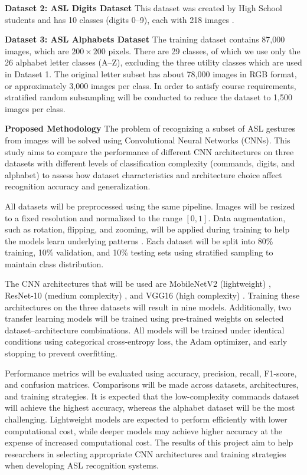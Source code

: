 \documentclass[10pt,twocolumn,letterpaper]{article}
\begin{document}
\vspace{0.5em}
\noindent\textbf{Dataset 2: ASL Digits Dataset \textbullet}
This dataset was created by High School students and has 10 classes (digits 0--9), each with 218 images \cite{mavi2020digits}.

\vspace{0.5em}
\noindent\textbf{Dataset 3: ASL Alphabets Dataset \textbullet}
The training dataset contains 87,000 images, which are $200 \times 200$ pixels. There are 29 classes, of which we use only the 26 alphabet letter classes (A--Z), excluding the three utility classes which are used in Dataset 1. The original letter subset has about 78,000 images in RGB format, or approximately 3,000 images per class. In order to satisfy course requirements, stratified random subsampling will be conducted to reduce the dataset to 1,500 images per class\cite{asl_alphabet_kaggle}.

\vspace{0.5em}
\noindent\textbf{Proposed Methodology \textbullet}
The problem of recognizing a subset of ASL gestures from images will be solved using Convolutional Neural Networks (CNNs). This study aims to compare the performance of different CNN architectures on three datasets with different levels of classification complexity (commands, digits, and alphabet) to assess how dataset characteristics and architecture choice affect recognition accuracy and generalization.

All datasets will be preprocessed using the same pipeline. Images will be resized to a fixed resolution and normalized to the range $[0,1]$. Data augmentation, such as rotation, flipping, and zooming, will be applied during training to help the models learn underlying patterns \cite{milvus_augmentation}. Each dataset will be split into 80\% training, 10\% validation, and 10\% testing sets using stratified sampling to maintain class distribution.

The CNN architectures that will be used are MobileNetV2 (lightweight) \cite{mobilenetv2}, ResNet-10 (medium complexity) \cite{resnet}, and VGG16 (high complexity) \cite{vgg16}. Training these architectures on the three datasets will result in nine models. Additionally, two transfer learning models will be trained using pre-trained weights on selected dataset--architecture combinations. All models will be trained under identical conditions using categorical cross-entropy loss, the Adam optimizer, and early stopping to prevent overfitting.

Performance metrics will be evaluated using accuracy, precision, recall, F1-score, and confusion matrices. Comparisons will be made across datasets, architectures, and training strategies. It is expected that the low-complexity commands dataset will achieve the highest accuracy, whereas the alphabet dataset will be the most challenging. Lightweight models are expected to perform efficiently with lower computational cost, while deeper models may achieve higher accuracy at the expense of increased computational cost. The results of this project aim to help researchers in selecting appropriate CNN architectures and training strategies when developing ASL recognition systems.
\end{document}
